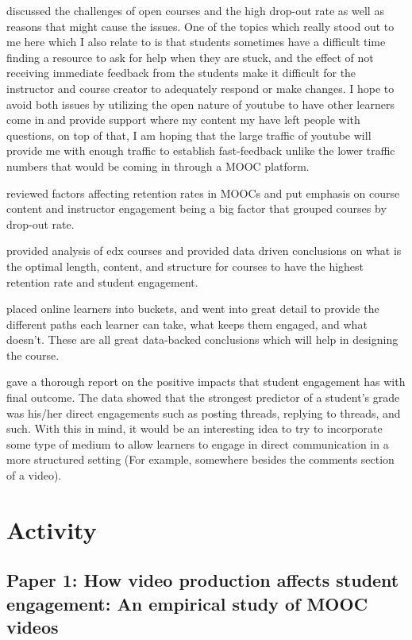 \documentclass[
	letterpaper, %
]{jdf}
\begin{document}
\citep{hew1} discussed the challenges of open courses and the high drop-out rate as well as reasons that might cause the issues. One of the topics which really stood out to me here which I also relate to is that students sometimes have a difficult time finding a resource to ask for help when they are stuck, and the effect of not receiving immediate feedback from the students make it difficult for the instructor and course creator to adequately respond or make changes. I hope to avoid both issues by utilizing the open nature of youtube to have other learners come in and provide support where my content my have left people with questions, on top of that, I am hoping that the large traffic of youtube will provide me with enough traffic to establish fast-feedback unlike the lower traffic numbers that would be coming in through a MOOC platform.

\citep{hone1} reviewed factors affecting retention rates in MOOCs and put emphasis on course content and instructor engagement being a big factor that grouped courses by drop-out rate.

\citep{kim1} provided analysis of edx courses and provided data driven conclusions on what is the optimal length, content, and structure for courses to have the highest retention rate and student engagement. 

\citep{kiz1} placed online learners into buckets, and went into great detail to provide the different paths each learner can take, what keeps them engaged, and what doesn't. These are all great data-backed conclusions which will help in designing the course.

\citep{houston1} gave a thorough report on the positive impacts that student engagement has with final outcome. The data showed that the strongest predictor of a student's grade was his/her direct engagements such as posting threads, replying to threads, and such. With this in mind, it would be an interesting idea to try to incorporate some type of medium to allow learners to engage in direct communication in a more structured setting (For example, somewhere besides the comments section of a video).

\section{Activity}
\subsection{Paper 1: How video production affects student engagement: An empirical study of MOOC videos \citep{guo1}}
\end{document}
